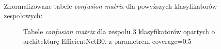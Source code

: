 \documentclass[polish,12pt]{aghthesis}
\begin{document}
\newpage
\noindent Znormalizowane tabele \textit{confusion matrix} dla powyższych klasyfikatorów zespołowych:
\begin{figure}[h!]%
    \begin{adjustbox}{minipage=1.0\paperwidth, pagecenter}
    \centering
    \qquad
    \end{adjustbox}
    \label{fig:eff-ens-3-0.5-matrices}
    \caption{Tabele \textit{confusion matrix} dla zespołu 3 klasyfikatorów opartych o architekturę EfficientNetB0, z parametrem coverage=0.5}
\end{figure}
\end{document}
